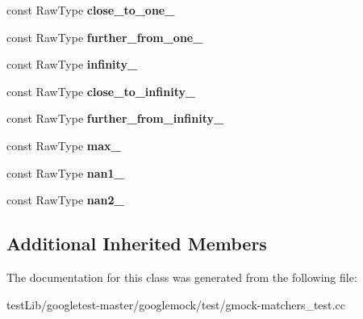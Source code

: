 \begin{DoxyCompactItemize}
const Raw\+Type {\bfseries close\+\_\+to\+\_\+one\+\_\+}
\item 
\mbox{\label{classtesting_1_1gmock__matchers__test_1_1FloatingPointTest_a049ba2d5d371e8aea6ada1ab5312b1bb}} 
const Raw\+Type {\bfseries further\+\_\+from\+\_\+one\+\_\+}
\item 
\mbox{\label{classtesting_1_1gmock__matchers__test_1_1FloatingPointTest_a21d8a019a6365ddff80e301a6163f43f}} 
const Raw\+Type {\bfseries infinity\+\_\+}
\item 
\mbox{\label{classtesting_1_1gmock__matchers__test_1_1FloatingPointTest_a6fc8ac2030f4883e1c84da3a21bbb7c3}} 
const Raw\+Type {\bfseries close\+\_\+to\+\_\+infinity\+\_\+}
\item 
\mbox{\label{classtesting_1_1gmock__matchers__test_1_1FloatingPointTest_a603ab51280ecb1c4147c2660a7a90728}} 
const Raw\+Type {\bfseries further\+\_\+from\+\_\+infinity\+\_\+}
\item 
\mbox{\label{classtesting_1_1gmock__matchers__test_1_1FloatingPointTest_a17b9dd56136b64fa7210bfe024d88c30}} 
const Raw\+Type {\bfseries max\+\_\+}
\item 
\mbox{\label{classtesting_1_1gmock__matchers__test_1_1FloatingPointTest_a0d2544956414eac21d4519fe600e4603}} 
const Raw\+Type {\bfseries nan1\+\_\+}
\item 
\mbox{\label{classtesting_1_1gmock__matchers__test_1_1FloatingPointTest_a4af3b3e53a06d271479ff30f5d5ee155}} 
const Raw\+Type {\bfseries nan2\+\_\+}
\end{DoxyCompactItemize}
\subsection*{Additional Inherited Members}


The documentation for this class was generated from the following file\+:\begin{DoxyCompactItemize}
\item 
test\+Lib/googletest-\/master/googlemock/test/gmock-\/matchers\+\_\+test.\+cc\end{DoxyCompactItemize}
